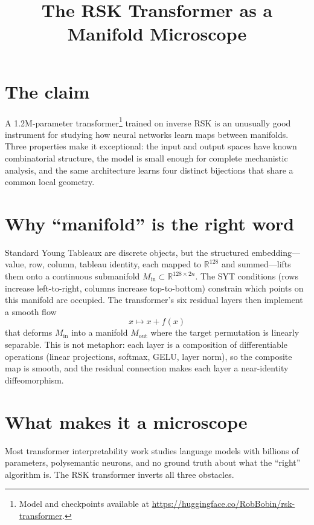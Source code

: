 \documentclass[11pt]{article}
\title{The RSK Transformer as a Manifold Microscope}
\author{}
\date{}
\begin{document}
\maketitle

\section*{The claim}

A 1.2M-parameter transformer\footnote{Model and checkpoints available at \url{https://huggingface.co/RobBobin/rsk-transformer}.} trained on inverse RSK is an unusually
good instrument for studying how neural networks learn maps between
manifolds. Three properties make it exceptional: the input and output
spaces have known combinatorial structure, the model is small enough
for complete mechanistic analysis, and the same architecture learns
four distinct bijections that share a common local geometry.

\section*{Why ``manifold'' is the right word}

Standard Young Tableaux are discrete objects, but the structured
embedding---value, row, column, tableau identity, each mapped to
$\mathbb{R}^{128}$ and summed---lifts them onto a continuous
submanifold $M_{\mathrm{in}} \subset \mathbb{R}^{128 \times 2n}$. The
SYT conditions (rows increase left-to-right, columns increase
top-to-bottom) constrain which points on this manifold are occupied.
The transformer's six residual layers then implement a smooth flow
\[
  x \mapsto x + f(x)
\]
that deforms $M_{\mathrm{in}}$ into a manifold $M_{\mathrm{out}}$
where the target permutation is linearly separable. This is not
metaphor: each layer is a composition of differentiable operations
(linear projections, softmax, GELU, layer norm), so the composite map
is smooth, and the residual connection makes each layer a
near-identity diffeomorphism.

\section*{What makes it a microscope}

Most transformer interpretability work studies language models with
billions of parameters, polysemantic neurons, and no ground truth
about what the ``right'' algorithm is. The RSK transformer inverts all
three obstacles.
\end{document}
